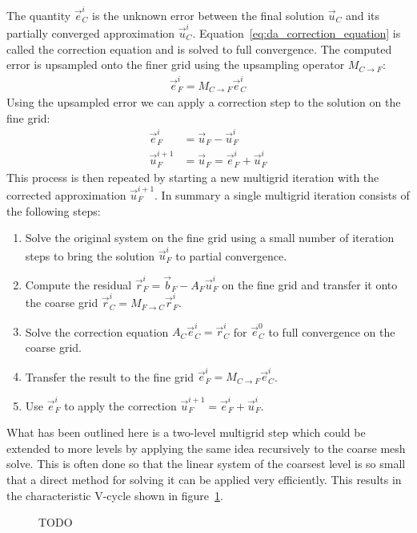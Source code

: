 The quantity $\vec{e}_C^i$ is the unknown error between the final solution $\vec{u}_C$ and its partially converged approximation $\vec{u}_C^i$. Equation~\ref{eq:da_correction_equation} is called the correction equation and is solved to full convergence. The computed error is upsampled onto the finer grid using the upsampling operator $M_{C\rightarrow F}$:
\begin{align}
\vec{e}_F^i = M_{C\rightarrow F}\vec{e}_C^i
\nonumber
\end{align}
Using the upsampled error we can apply a correction step to the solution on the fine grid:
\begin{align}
\vec{e}_F^i &= \vec{u}_F - \vec{u}_F^i
\nonumber
\\
\vec{u}_F^{i+1} &= \vec{u}_F = \vec{e}_F^i + \vec{u}_F^i
\nonumber
\end{align}
This process is then repeated by starting a new multigrid iteration with the corrected approximation $\vec{u}_F^{i+1}$. In summary a single multigrid iteration consists of the following steps:
\begin{enumerate}
\item Solve the original system on the fine grid using a small number of iteration steps to bring the solution $\vec{u}_F^i$ to partial convergence.
\item Compute the residual $\vec{r}_F^i=\vec{b}_F - A_F\vec{u}_F^i$ on the fine grid and transfer it onto the coarse grid $\vec{r}_C^i = M_{F\rightarrow C}\vec{r}_F^i$.
\item Solve the correction equation $A_C\vec{e}_C^i = \vec{r}_C^i$ for $\vec{e}_C^0$ to full convergence on the coarse grid.
\item Transfer the result to the fine grid $\vec{e}_F^i = M_{C\rightarrow F}\vec{e}_C^i$.
\item Use $\vec{e}_F^i$ to apply the correction $\vec{u}_F^{i+1} =  \vec{e}_F^i + \vec{u}_F^i$.
\end{enumerate}
What has been outlined here is a two-level multigrid step which could be extended to more levels by applying the same idea recursively to the coarse mesh solve. This is often done so that the linear system of the coarsest level is so small that a direct method for solving it can be applied very efficiently. This results in the characteristic V-cycle shown in figure~\ref{fig:da_solver_multigrid_vcycles}.
\begin{figure}[h]
\centering
{}
\caption{TODO}
\label{fig:da_solver_multigrid_vcycles}
\end{figure}

